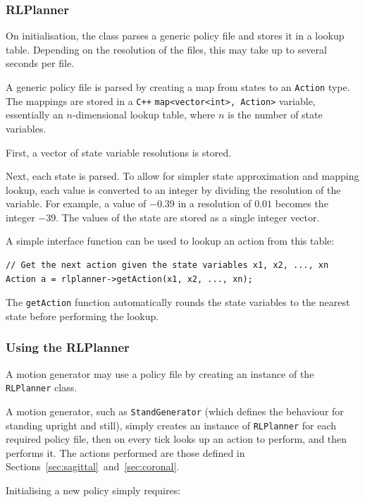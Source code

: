 \subsubsection{RLPlanner}

On initialisation, the class parses a generic policy file and stores it in a lookup table. Depending on the resolution of the files, this may take up to several seconds per file.

A generic policy file is parsed by creating a map from states to an \texttt{Action} type. The  mappings are stored in a \verb!C++! \texttt{map<vector<int>, Action>} variable, essentially an $n$-dimensional lookup table, where $n$ is the number of state variables.

First, a vector of state variable resolutions is stored.

Next, each state is parsed. To allow for simpler state approximation and mapping lookup, each value is converted to an integer by dividing the resolution of the variable. For example, a value of $-0.39$ in a resolution of $0.01$ becomes the integer $-39$. The values of the state are stored as a single integer vector.


A simple interface function can be used to lookup an action from this table:

\begin{lstlisting}
// Get the next action given the state variables x1, x2, ..., xn
Action a = rlplanner->getAction(x1, x2, ..., xn);
\end{lstlisting}

The \texttt{getAction} function automatically rounds the state variables to the nearest state before performing the lookup.

\subsubsection{Using the RLPlanner}

A motion generator may use a policy file by creating an instance of the \texttt{RLPlanner} class.

A motion generator, such as \texttt{StandGenerator} (which defines the behaviour for standing upright and still), simply creates an instance of \texttt{RLPlanner} for each required policy file, then on every tick looks up an action to perform, and then performs it. The actions performed are those defined in Sections~\ref{sec:sagittal}~and~\ref{sec:coronal}.

Initialising a new policy simply requires:

